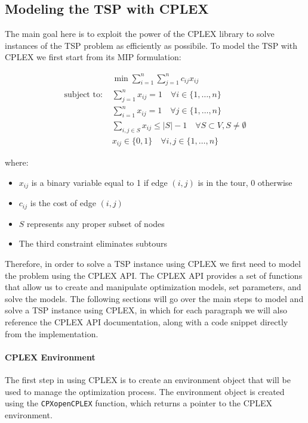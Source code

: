 \documentclass{article}
\begin{document}
\subsection{Modeling the TSP with CPLEX}
The main goal here is to exploit the power of the CPLEX library to solve instances of the TSP problem as efficiently as possibile. 
To model the TSP with CPLEX we first start from its MIP formulation:

\begin{align}
	& \min \sum_{i=1}^{n} \sum_{j=1}^{n} c_{ij} x_{ij} \\
	\text{subject to: } & \sum_{j=1}^{n} x_{ij} = 1 \quad \forall i \in \{1,\ldots,n\} \\
	& \sum_{i=1}^{n} x_{ij} = 1 \quad \forall j \in \{1,\ldots,n\} \\
	& \sum_{i,j \in S} x_{ij} \leq |S|-1 \quad \forall S \subset V, S \neq \emptyset \\
	& x_{ij} \in \{0,1\} \quad \forall i,j \in \{1,\ldots,n\}
\end{align}

where:
\begin{itemize}
	\item $x_{ij}$ is a binary variable equal to 1 if edge $(i,j)$ is in the tour, 0 otherwise
	\item $c_{ij}$ is the cost of edge $(i,j)$
	\item $S$ represents any proper subset of nodes
	\item The third constraint eliminates subtours
\end{itemize}

Therefore, in order to solve a TSP instance using CPLEX we first need to model the problem using the CPLEX API.
The CPLEX API provides a set of functions that allow us to create and manipulate optimization models, set parameters, and solve the models.
The following sections will go over the main steps to model and solve a TSP instance using CPLEX, in which for each paragraph we will also reference 
the CPLEX API documentation, along with a code snippet directly from the implementation. 

\paragraph{CPLEX Environment}
The first step in using CPLEX is to create an environment object that will be used to manage the optimization process.
The environment object is created using the \texttt{CPXopenCPLEX} function, which returns a pointer to the CPLEX environment.~\cite{cplex_api}
\end{document}
